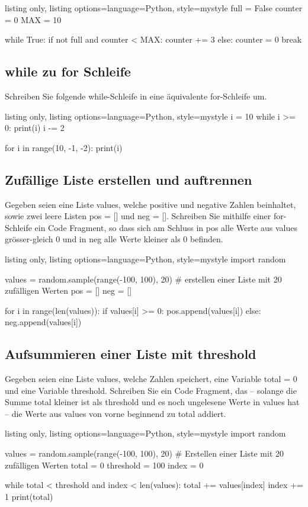 \documentclass[11pt, oneside]{book}
\begin{document}
\begin{tcblisting}{listing only, listing options={language=Python, style=mystyle}}
full = False
counter = 0
MAX = 10

while True:
    if not full and counter < MAX:
        counter += 3
    else:
        counter = 0
        break
\end{tcblisting}

\subsection{while zu for Schleife}
Schreiben Sie folgende while-Schleife in eine äquivalente for-Schleife um.
\begin{tcblisting}{listing only, listing options={language=Python, style=mystyle}}
i = 10
while i >= 0:
    print(i)
    i -= 2

for i in range(10, -1, -2):
    print(i)
\end{tcblisting}

\subsection{Zufällige Liste erstellen und auftrennen}
Gegeben seien eine Liste values, welche positive und negative Zahlen beinhaltet, sowie zwei leere Listen pos = [] und neg = []. Schreiben Sie mithilfe einer for-Schleife ein Code Fragment, so dass sich am Schluss in pos alle Werte aus values grösser-gleich 0 und in neg alle Werte kleiner als 0 befinden.

\begin{tcblisting}{listing only, listing options={language=Python, style=mystyle}}
import random

values = random.sample(range(-100, 100), 20) # erstellen einer Liste mit 20 zufälligen Werten 
pos = []
neg = []

for i in range(len(values)):
    if values[i] >= 0:
        pos.append(values[i])
    else:
        neg.append(values[i])
\end{tcblisting}

\subsection{Aufsummieren einer Liste mit threshold}
Gegeben seien eine Liste values, welche Zahlen speichert, eine Variable total = 0 und eine Variable threshold. Schreiben Sie ein Code Fragment, das – solange die Summe total kleiner ist als threshold und es noch ungelesene Werte in values hat – die Werte aus values von vorne beginnend zu total addiert.
\begin{tcblisting}{listing only, listing options={language=Python, style=mystyle}}
import random

values = random.sample(range(-100, 100), 20)  # Erstellen einer Liste mit 20 zufälligen Werten
total = 0
threshold = 100
index = 0

while total < threshold and index < len(values):
    total += values[index]
    index += 1
print(total)
\end{tcblisting}
\end{document}
